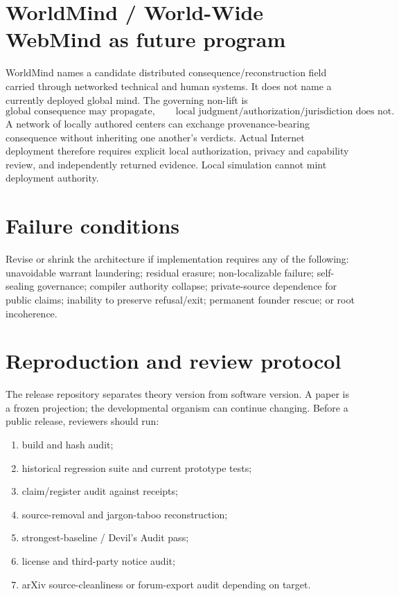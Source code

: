 \documentclass[11pt]{article}
\begin{document}
\section{WorldMind / World-Wide WebMind as future program}
WorldMind names a candidate distributed consequence/reconstruction field carried
through networked technical and human systems. It does not name a currently
deployed global mind. The governing non-lift is
\begin{equation}
\text{global consequence may propagate},\qquad
\text{local judgment/authorization/jurisdiction does not}.
\end{equation}
A network of locally authored centers can exchange provenance-bearing
consequence without inheriting one another's verdicts. Actual Internet
deployment therefore requires explicit local authorization, privacy and
capability review, and independently returned evidence. Local simulation cannot
mint deployment authority.

\section{Failure conditions}
Revise or shrink the architecture if implementation requires any of the
following: unavoidable warrant laundering; residual erasure; non-localizable
failure; self-sealing governance; compiler authority collapse; private-source
dependence for public claims; inability to preserve refusal/exit; permanent
founder rescue; or root incoherence.

\section{Reproduction and review protocol}
The release repository separates theory version from software version. A paper
is a frozen projection; the developmental organism can continue changing.
Before a public release, reviewers should run:
\begin{enumerate}
\item build and hash audit;
\item historical regression suite and current prototype tests;
\item claim/register audit against receipts;
\item source-removal and jargon-taboo reconstruction;
\item strongest-baseline / Devil's Audit pass;
\item license and third-party notice audit;
\item arXiv source-cleanliness or forum-export audit depending on target.
\end{enumerate}
\end{document}
